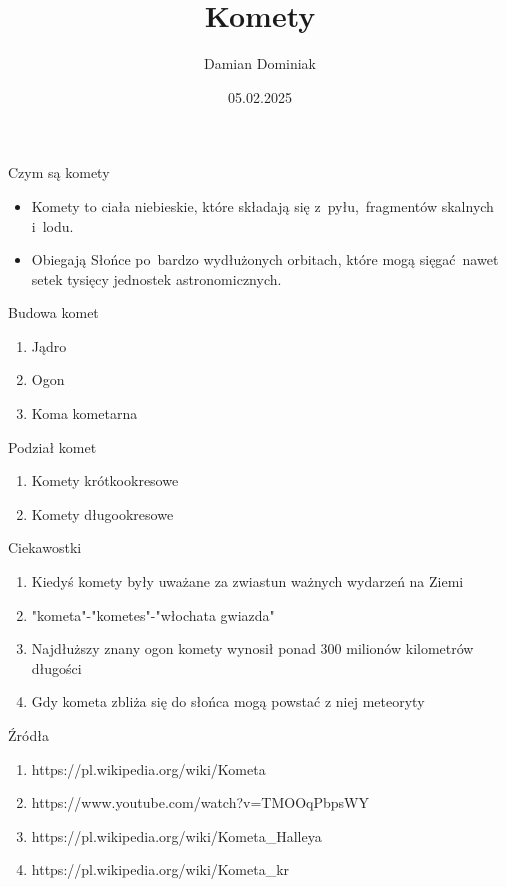 \documentclass{beamer}
\title{Komety}
\author{Damian Dominiak}
\date{05.02.2025}
\begin{document}
\begin{frame}
    \titlepage
\end{frame}


\begin{frame}{Czym są komety}
    \begin{itemize}
        \item Komety to ciała niebieskie, które składają się z pyłu, fragmentów skalnych i lodu. 

        \item Obiegają Słońce po bardzo wydłużonych orbitach, które mogą sięgać nawet setek tysięcy jednostek astronomicznych.

    \end{itemize}
\end{frame}


\begin{frame}{Budowa komet}
    \begin{enumerate}
        \item Jądro
        \item Ogon
        \item Koma kometarna
    \end{enumerate}
\end{frame}


\begin{frame}{Podział komet}
    \begin{enumerate}
        \item Komety krótkookresowe
        \item Komety długookresowe
    \end{enumerate}
\end{frame}

\begin{frame}{Ciekawostki}
    \begin{enumerate}
        \item Kiedyś komety były uważane za zwiastun ważnych wydarzeń na Ziemi 
        \item "kometa"-"kometes"-"włochata gwiazda"
        \item Najdłuższy znany ogon komety wynosił ponad 300 milionów kilometrów długości
        \item  Gdy kometa zbliża się do słońca mogą powstać z niej meteoryty

    \end{enumerate}
\end{frame}

\begin{frame}{Źródła}
    \begin{enumerate}
        \item https://pl.wikipedia.org/wiki/Kometa
        \item https://www.youtube.com/watch?v=TMOOqPbpsWY
        \item https://pl.wikipedia.org/wiki/Kometa_Halleya
        \item  https://pl.wikipedia.org/wiki/Kometa_kr%


    \end{enumerate}
\end{frame}
\end{document}
